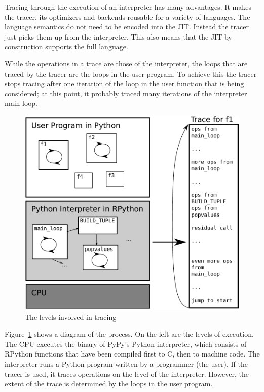 \documentclass{sigplanconf}
\begin{document}
Tracing through the execution of an interpreter has many advantages. It makes
the tracer, its optimizers and backends reusable for a variety of languages. The
language semantics do not need to be encoded into the JIT. Instead the tracer
just picks them up from the interpreter. This also means that the JIT by
construction supports the full language.

While the operations in a trace are those of the interpreter, the loops that are
traced by the tracer are the loops in the
user program. To achieve this the tracer stops tracing after one iteration of
the loop in the user function that is being considered; at this point, it probably
traced many iterations of the interpreter main loop.

\begin{figure}
\includegraphics[scale=0.5]{figures/trace-levels}
\caption{The levels involved in tracing}
\label{fig:trace-levels}
\end{figure}

Figure~\ref{fig:trace-levels} shows a diagram of the process. On the left are
the levels of execution. The CPU executes the binary of
PyPy's Python interpreter, which consists of RPython functions that have been
compiled first to C, then to machine code. The interpreter runs a Python program written by a
programmer (the user). If the tracer is used, it traces operations on the level
of the interpreter. However, the extent of the trace is determined by the loops
in the user program.
\end{document}
